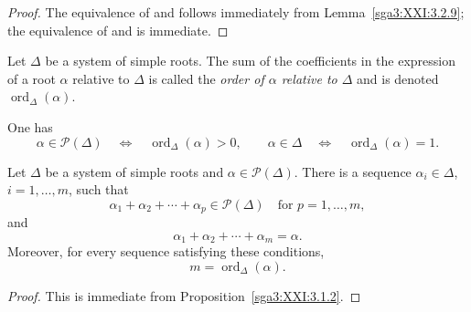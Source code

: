\begin{proof}
The equivalence of  and  follows immediately from
Lemma~\ref{sga3:XXI:3.2.9}; the equivalence of  and  is
immediate.
\end{proof}

\begin{definition}\label{sga3:XXI:3.2.15}
Let \(\Delta\) be a system of simple roots. The sum of the
coefficients in the expression of a root \(\alpha\) relative to
\(\Delta\) is called the \emph{order of \(\alpha\) relative to
\(\Delta\)} and is denoted \(\operatorname{ord}_\Delta(\alpha)\).
\end{definition}

One has
\[
 \alpha\in\mathscr{P}(\Delta)
 \quad\Longleftrightarrow\quad
 \operatorname{ord}_\Delta(\alpha)>0,
 \qquad
 \alpha\in\Delta
 \quad\Longleftrightarrow\quad
 \operatorname{ord}_\Delta(\alpha)=1.
\]

\begin{lemma}\label{sga3:XXI:3.2.16}
Let \(\Delta\) be a system of simple roots and
\(\alpha\in\mathscr{P}(\Delta)\). There is a sequence
\(\alpha_i\in\Delta\), \(i=1,\ldots,m\), such that
\[
 \alpha_1+\alpha_2+\cdots+\alpha_p\in\mathscr{P}(\Delta)
 \quad\text{for }p=1,\ldots,m,
\]
and
\[
 \alpha_1+\alpha_2+\cdots+\alpha_m=\alpha.
\]
Moreover, for every sequence satisfying these conditions,
\[
 m=\operatorname{ord}_\Delta(\alpha).
\]
\end{lemma}

\begin{proof}
This is immediate from Proposition~\ref{sga3:XXI:3.1.2}.
\end{proof}
